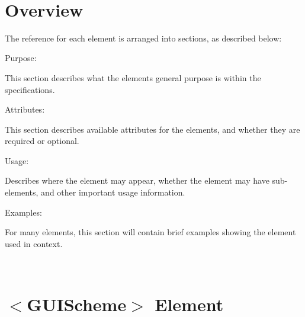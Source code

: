 ~\newline
 \hypertarget{xml_scheme_xml_scheme_overview}{}\section{Overview}\label{xml_scheme_xml_scheme_overview}
The reference for each element is arranged into sections, as described below\+:
\begin{DoxyItemize}
\item Purpose\+:
\begin{DoxyItemize}
\item This section describes what the elements general purpose is within the specifications.
\end{DoxyItemize}
\item Attributes\+:
\begin{DoxyItemize}
\item This section describes available attributes for the elements, and whether they are required or optional.
\end{DoxyItemize}
\item Usage\+:
\begin{DoxyItemize}
\item Describes where the element may appear, whether the element may have sub-\/elements, and other important usage information.
\end{DoxyItemize}
\item Examples\+:
\begin{DoxyItemize}
\item For many elements, this section will contain brief examples showing the element used in context.
\end{DoxyItemize}
\end{DoxyItemize}

~\newline
 \hypertarget{xml_scheme_xml_scheme_guischeme}{}\section{$<$\+G\+U\+I\+Scheme$>$ Element}\label{xml_scheme_xml_scheme_guischeme}

